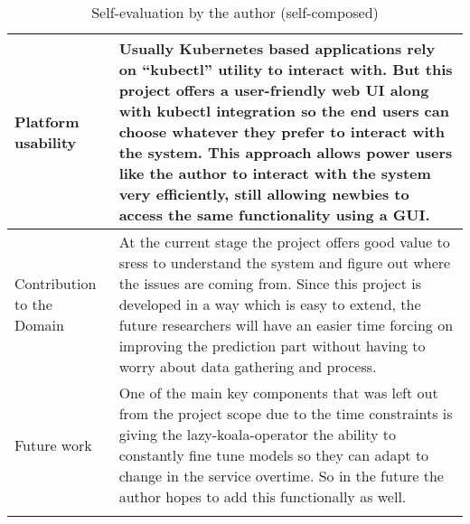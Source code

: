 \begin{longtable}{|p{33mm}|p{120mm}|}
  Platform usability &
    Usually Kubernetes based applications rely on “kubectl” utility to interact with. But this project offers a user-friendly web UI along with kubectl integration so the end users can choose whatever they prefer to interact with the system. This approach allows power users like the author to interact with the system very efficiently, still allowing newbies to access the same functionality using a GUI. \\ \hline
  Contribution to the Domain &
    At the current stage the project offers good value to \acp{sres} to understand the system and figure out where the issues are coming from. Since this project is developed in a way which is easy to extend, the future researchers will have an easier time forcing on improving the prediction part without having to worry about data gathering and process. \\ \hline
  Future work &
    One of the main key components that was left out from the project scope due to the time constraints is giving the \ac{lazy-koala-operator}  the ability to constantly fine tune models so they can adapt to change in the service overtime. So in the future the author hopes to add this functionally as well. \\ \hline
  
    \caption{Self-evaluation by the author (self-composed)}
\end{longtable}